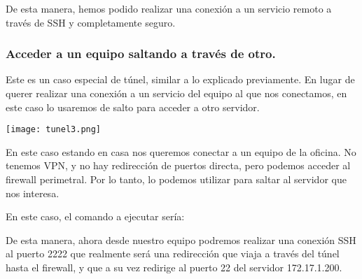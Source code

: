 De esta manera, hemos podido realizar una conexión a un servicio remoto a través de SSH y completamente seguro.


\subsubsection{Acceder a un equipo saltando a través de otro.}
Este es un caso especial de túnel, similar a lo explicado previamente. En lugar de querer realizar una conexión a un servicio del equipo al que nos conectamos, en este caso lo usaremos de salto para acceder a otro servidor.

\vspace{-10pt}
\begin{center}
    \texttt{[image: tunel3.png]}
\end{center}
\vspace{-10pt}

En este caso estando en casa nos queremos conectar a un equipo de la oficina. No tenemos VPN, y no hay redirección de puertos directa, pero podemos acceder al firewall perimetral. Por lo tanto, lo podemos utilizar para saltar al servidor que nos interesa.

En este caso, el comando a ejecutar sería:


De esta manera, ahora desde nuestro equipo podremos realizar una conexión SSH al puerto 2222 que realmente será una redirección que viaja a través del túnel hasta el firewall, y que a su vez redirige al puerto 22 del servidor 172.17.1.200.








\clearpage